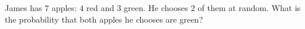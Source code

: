 James has $7$ apples: $4$ red and $3$ green. He chooses $2$ of them at random. What is the probability that both apples he chooses are green?
